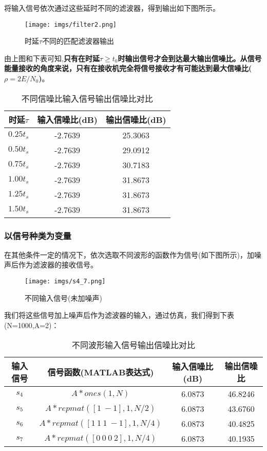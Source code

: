 \documentclass[a4paper]{article}
\begin{document}
将输入信号依次通过这些延时不同的滤波器，得到输出如下图所示。
\newpage


\begin{figure}[htbp]
\centering
\texttt{[image: imgs/filter2.png]}
\caption{时延$\tau$不同的匹配滤波器输出}
\end{figure}


由上图和下表可知,{\bfseries 只有在时延$\tau \ge t_0$时输出信号才会到达最大输出信噪比。从信号能量接收的角度来说，只有在接收机完全将信号接收才有可能达到最大信噪比($\rho=2E/N_0$)}。
\begin{table}[h]
\centering
\caption{不同信噪比输入信号输出信噪比对比}
\begin{tabular}[h]{ccc}
\hline
时延$\tau$& 输入信噪比(dB)& 输出信噪比(dB)\\
\hline
$0.25t_s$ & -2.7639 &25.3063\\
$0.50t_s$ & -2.7639 &29.0912\\
$0.75t_s$ & -2.7639 &30.7183\\
$1.00t_s$ & -2.7639 &31.8673\\
$1.25t_s$ & -2.7639 &31.8673\\
$1.50t_s$ & -2.7639 &31.8673\\
\hline
\end{tabular}
\end{table}


\subsubsection{以信号种类为变量}
在其他条件一定的情况下，依次选取不同波形的函数作为信号(如下图所示)，加噪声后作为滤波器的接收信号。

\begin{figure}[htbp]
\centering
\texttt{[image: imgs/s4\_7.png]}
\caption{不同输入信号(未加噪声)}
\end{figure}
\newpage
我们将这些信号加上噪声后作为滤波器的输入，通过仿真，我们得到下表(N=1000,A=2)：

\begin{table}[htbp]
\centering
\caption{不同波形输入信号输出信噪比对比}
\begin{tabular}[htbp]{cccc}
\hline
输入信号&信号函数(MATLAB表达式)& 输入信噪比(dB)& 输出信噪比\\
\hline
$s_4$	&$A*ones(1,N)$					&6.0873&46.8246 \\
$s_5$	&$A*repmat([1\ -1],1,N/2)$			&6.0873&43.6760\\
$s_6$	&$A*repmat([1\ 1\ 1\ -1],1,N/4)$	&6.0873&40.4825\\
$s_7$	&$A*repmat([0\ 0\ 0\ 2],1,N/4)$		&6.0873&40.1935\\
\hline
\end{tabular}
\end{table}
\end{document}
